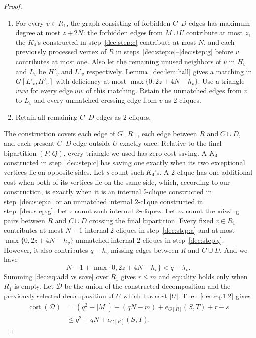 \documentclass[11pt]{article}
\numberwithin{equation}{section}
\theoremstyle{remark}
\DeclareMathOperator{\cost}{cost}
\begin{document}
\begin{proof}
\begin{enumerate}[label=\textup{(\alph*)}]
\item For every \(v\in R_1\), the graph consisting of forbidden \(C\)--\(D\) edges has maximum degree at most \(z+2N\):
the forbidden edges from \(M\cup U\) contribute at most \(z\), the \(K_4\)'s constructed in step~\ref{dec:step:c} contribute
at most \(N\), and each previously processed vertex of \(R\) in steps~\ref{dec:step:e}--\ref{dec:step:g} before \(v\) contributes
at most one. Also let the remaining unused neighbors of \(v\) in \(H_v\) and \(L_v\) be \(H'_v\) and \(L'_v\) respectively.
Lemma~\ref{dec:lem:hall} gives a matching in \(G[L'_v,H'_v]\) with deficiency at most \(\max\{0,2z+4N-h_v\}\).
Use a triangle \(vuw\) for every edge \(uw\) of this matching.  Retain the unmatched edges from \(v\) to \(L_v\) and
every unmatched crossing edge from \(v\) as \(2\)-cliques.\label{dec:step:g}

\item Retain all remaining \(C\)--\(D\) edges as \(2\)-cliques.\label{dec:step:h}
\end{enumerate}

The construction covers each edge of \(G[R]\), each edge between \(R\) and \(C\cup D\),
and each present \(C\)--\(D\) edge outside \(U\) exactly once. Relative to the final bipartition \((P, Q)\),
every triangle we used has zero cost saving. A \(K_4\) constructed in step~\ref{dec:step:c} has saving one
exactly when its two exceptional vertices lie on opposite sides. Let \(s\) count such \(K_4\)'s.
A \(2\)-clique has one additional cost when both of its vertices lie on the same side, which,
according to our construction, is exactly when it is an internal \(2\)-clique constructed in
step~\ref{dec:step:a} or an unmatched internal \(2\)-clique constructed in step~\ref{dec:step:g}.
Let \(r\) count such internal \(2\)-cliques. Let \(m\) count the missing pairs between \(R\)
and \(C\cup D\) crossing the final bipartition. Every fixed \(v\in R_1\) contributes at most \(N-1\) internal
\(2\)-cliques in step~\ref{dec:step:a} and at most \(\max\{0,2z+4N-h_v\}\) unmatched internal \(2\)-cliques
in step~\ref{dec:step:g}. However, it also contributes \(q-h_v\) missing edges between \(R\) and \(C\cup D\). And we have
\begin{equation}\label{dec:eq:add vs save}
  N-1+\max\{0,2z+4N-h_v\}< q-h_v.
\end{equation}
Summing \eqref{dec:eq:add vs save} over \(R_1\) gives \(r\le m\) and equality holds only when \(R_1\) is empty.
Let \(\mathcal D\) be the union of the constructed decomposition and the previously selected decomposition of \(U\) which
has cost \(|U|\). Then \eqref{dec:eq:1.2} gives
\begin{equation}\label{dec:eq:3.34}
  \begin{aligned}
     \cost(\mathcal D)&=(q^2-|M|)+(qN-m)+e_{G[R]}(S,T)+r-s\\
     &\le q^2+qN+e_{G[R]}(S,T).
  \end{aligned}
\end{equation}
\end{proof}
\end{document}

